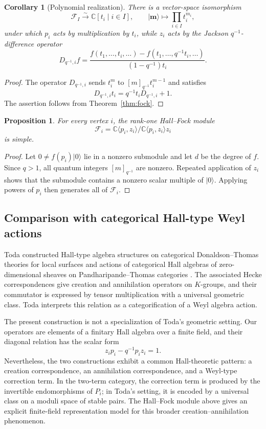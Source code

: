 \documentclass[12pt]{article}
\theoremstyle{plain}
\newtheorem{proposition}[theorem]{Proposition}
\newtheorem{corollary}[theorem]{Corollary}
\theoremstyle{remark}
\begin{document}
\begin{corollary}[Polynomial realization]\label{cor:polynomial}
There is a vector-space isomorphism
\[
 \mathcal F_I\xrightarrow{\sim}\mathbb C[t_i\mid i\in I],
 \qquad
 |\mathbf m\rangle\longmapsto\prod_{i\in I}t_i^{m_i},
\]
under which $p_i$ acts by multiplication by $t_i$, while $z_i$ acts by the
Jackson $q^{-1}$-difference operator
\[
 D_{q^{-1},i}f
 =\frac{f(t_1,\ldots,t_i,\ldots)-
 f(t_1,\ldots,q^{-1}t_i,\ldots)}{(1-q^{-1})t_i}.
\]
\end{corollary}

\begin{proof}
The operator $D_{q^{-1},i}$ sends $t_i^m$ to
$[m]_{q^{-1}}t_i^{m-1}$ and satisfies
\[
 D_{q^{-1},i}t_i=q^{-1}t_iD_{q^{-1},i}+1.
\]
The assertion follows from Theorem~\ref{thm:fock}.
\end{proof}

\begin{proposition}\label{prop:simple-fock}
For every vertex $i$, the rank-one Hall--Fock module
\[
 \mathcal F_i=
 \mathbb C\langle p_i,z_i\rangle/
 \mathbb C\langle p_i,z_i\rangle z_i
\]
is simple.
\end{proposition}

\begin{proof}
Let $0\ne f(p_i)|0\rangle$ lie in a nonzero submodule and let $d$ be the
degree of $f$. Since $q>1$, all quantum integers $[m]_{q^{-1}}$ are
nonzero. Repeated application of $z_i$ shows that the submodule contains a
nonzero scalar multiple of $|0\rangle$. Applying powers of $p_i$ then
generates all of $\mathcal F_i$.
\end{proof}

\subsection*{Comparison with categorical Hall-type Weyl actions}

Toda constructed Hall-type algebra structures on categorical
Donaldson--Thomas theories for local surfaces and actions of categorical
Hall algebras of zero-dimensional sheaves on Pandharipande--Thomas
categories \cite{Toda20}. The associated Hecke correspondences give
creation and annihilation operators on $K$-groups, and their commutator is
expressed by tensor multiplication with a universal geometric class. Toda
interprets this relation as a categorification of a Weyl algebra action.

The present construction is not a specialization of Toda's geometric
setting. Our operators are elements of a finitary Hall algebra over a finite
field, and their diagonal relation has the scalar form
\[
 z_ip_i-q^{-1}p_iz_i=1.
\]
Nevertheless, the two constructions exhibit a common Hall-theoretic
pattern: a creation correspondence, an annihilation correspondence, and a
Weyl-type correction term. In the two-term category, the correction term is
produced by the invertible endomorphisms of $P_i$; in Toda's setting, it is
encoded by a universal class on a moduli space of stable pairs. The
Hall--Fock module above gives an explicit finite-field representation model
for this broader creation--annihilation phenomenon.
\end{document}
